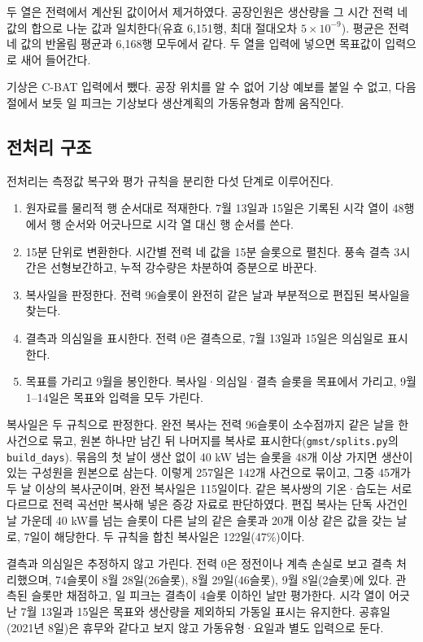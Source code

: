두 열은 전력에서 계산된 값이어서 제거하였다. 공장인원은 생산량을 그 시간 전력 네 값의 합으로 나눈 값과 일치한다(유효 6,151행, 최대 절대오차 $5\times10^{-9}$). 평균은 전력 네 값의 반올림 평균과 6,168행 모두에서 같다. 두 열을 입력에 넣으면 목표값이 입력으로 새어 들어간다.

기상은 C-BAT 입력에서 뺐다. 공장 위치를 알 수 없어 기상 예보를 붙일 수 없고, 다음 절에서 보듯 일 피크는 기상보다 생산계획의 가동유형과 함께 움직인다.

\subsection{전처리 구조}

전처리는 측정값 복구와 평가 규칙을 분리한 다섯 단계로 이루어진다.
\begin{enumerate}
\item 원자료를 물리적 행 순서대로 적재한다. 7월 13일과 15일은 기록된 시각 열이 48행에서 행 순서와 어긋나므로 시각 열 대신 행 순서를 쓴다.
\item 15분 단위로 변환한다. 시간별 전력 네 값을 15분 슬롯으로 펼친다. 풍속 결측 3시간은 선형보간하고, 누적 강수량은 차분하여 증분으로 바꾼다.
\item 복사일을 판정한다. 전력 96슬롯이 완전히 같은 날과 부분적으로 편집된 복사일을 찾는다.
\item 결측과 의심일을 표시한다. 전력 0은 결측으로, 7월 13일과 15일은 의심일로 표시한다.
\item 목표를 가리고 9월을 봉인한다. 복사일·의심일·결측 슬롯을 목표에서 가리고, 9월 1--14일은 목표와 입력을 모두 가린다.
\end{enumerate}

복사일은 두 규칙으로 판정한다. 완전 복사는 전력 96슬롯이 소수점까지 같은 날을 한 사건으로 묶고, 원본 하나만 남긴 뒤 나머지를 복사로 표시한다(\texttt{gmst/splits.py}의 \texttt{build\_days}). 묶음의 첫 날이 생산 없이 40 kW 넘는 슬롯을 48개 이상 가지면 생산이 있는 구성원을 원본으로 삼는다. 이렇게 257일은 142개 사건으로 묶이고, 그중 45개가 두 날 이상의 복사군이며, 완전 복사일은 115일이다. 같은 복사쌍의 기온·습도는 서로 다르므로 전력 곡선만 복사해 넣은 증강 자료로 판단하였다. 편집 복사는 단독 사건인 날 가운데 40 kW를 넘는 슬롯이 다른 날의 같은 슬롯과 20개 이상 같은 값을 갖는 날로, 7일이 해당한다. 두 규칙을 합친 복사일은 122일(47\%)이다.

결측과 의심일은 추정하지 않고 가린다. 전력 0은 정전이나 계측 손실로 보고 결측 처리했으며, 74슬롯이 8월 28일(26슬롯), 8월 29일(46슬롯), 9월 8일(2슬롯)에 있다. 관측된 슬롯만 채점하고, 일 피크는 결측이 4슬롯 이하인 날만 평가한다. 시각 열이 어긋난 7월 13일과 15일은 목표와 생산량을 제외하되 가동일 표시는 유지한다. 공휴일(2021년 8일)은 휴무와 같다고 보지 않고 가동유형·요일과 별도 입력으로 둔다.

